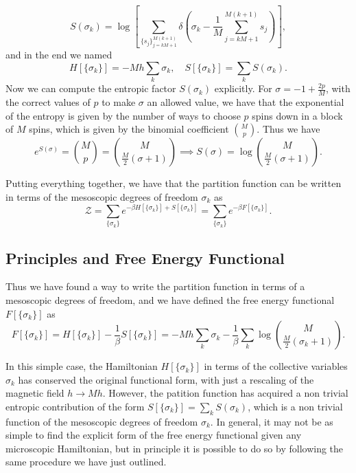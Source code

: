 \[
    S(\sigma_k) = \log\left[\sum_{\{s_j\}_{j=kM+1}^{M(k+1)}} \delta\left( \sigma_k - \frac{1}{M} \sum_{j = kM + 1}^{M(k+1)} s_j\right)\right],
\]
and in the end we named
\[
    H[\{\sigma_k\}] = -M h \sum_k \sigma_k, \quad S[\{\sigma_k\}] = \sum_k S(\sigma_k).
\]
Now we can compute the entropic factor \(S(\sigma_k)\) explicitly. For \(\sigma = - 1 + \frac{2p}{M}\), with the correct values of \(p\) to make \(\sigma\) an allowed value, we have that the exponential of the entropy is given by the number of ways to choose \(p\) spins down in a block of \(M\) spins, which is given by the binomial coefficient \(\binom{M}{p}\). Thus we have
\[
    e^{S(\sigma)} = \binom{M}{p} = \binom{M}{\tfrac{M}{2}(\sigma + 1)} \implies S(\sigma) = \log\binom{M}{\tfrac{M}{2}(\sigma + 1)}.
\]

Putting everything together, we have that the partition function can be written in terms of the mesoscopic degrees of freedom \(\sigma_k\) as
\[
    \mathcal{Z} = \sum_{\{\sigma_k\}} e^{-\beta H[\{\sigma_k\}] + S[\{\sigma_k\}]} = \sum_{\{\sigma_k\}} e^{-\beta F[\{\sigma_k\}]}.
\]

\subsection{Principles and Free Energy Functional}

Thus we have found a way to write the partition function in terms of a mesoscopic degrees of freedom, and we have defined the free energy functional \(F[\{\sigma_k\}]\) as
\[
    F[\{\sigma_k\}] = H[\{\sigma_k\}] - \frac{1}{\beta} S[\{\sigma_k\}] = - M h \sum_k \sigma_k - \frac{1}{\beta} \sum_k \log\binom{M}{\tfrac{M}{2}(\sigma_{k} +1)}.
\]

In this simple case, the Hamiltonian \(H[\{\sigma_k\}]\) in terms of the collective variables \(\sigma_k\) has conserved the original functional form, with just a rescaling of the magnetic field \(h \to Mh\). However, the patition function has acquired a non trivial entropic contribution of the form \(S[\{\sigma_k\}] = \sum_k S(\sigma_k)\), which is a non trivial function of the mesoscopic degrees of freedom \(\sigma_k\). In general, it may not be as simple to find the explicit form of the free energy functional given any microscopic Hamiltonian, but in principle it is possible to do so by following the same procedure we have just outlined.

